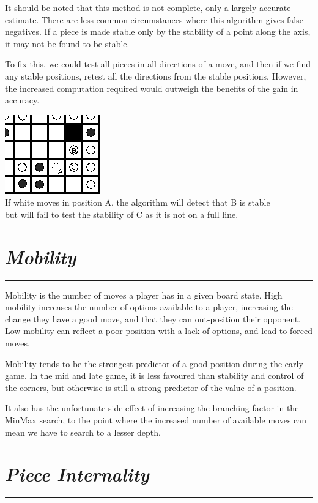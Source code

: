 \documentclass[10pt]{report}
\begin{document}
\begin{multicols}{2}
It should be noted that this method is not complete, only a largely accurate estimate. There are less common circumstances where this algorithm gives false negatives. If a piece is made stable only by the stability of a point along the axis, it may not be found to be stable.

To fix this, we could test all pieces in all directions of a move, and then if we find any stable positions, retest all the directions from the stable positions. However, the increased computation required would outweigh the benefits of the gain in accuracy.

\begin{center}
\includegraphics[scale=0.6]{falsepos.PNG}\\
If white moves in position A, the algorithm will detect that B is stable\\ but will fail to test the stability of C as it is not on a full line.
\end{center}

\section*{\emph{\textmd{Mobility}}}
\hrule

Mobility is the number of moves a player has in a given board state. High mobility increases the number of options available to a player, increasing the change they have a good move, and that they can out-position their opponent. Low mobility can reflect a poor position with a lack of options, and lead to forced moves.

Mobility tends to be the strongest predictor of a good position during the early game. In the mid and late game, it is less favoured than stability and control of the corners, but otherwise is still a strong predictor of the value of a position.

It also has the unfortunate side effect of increasing the branching factor in the MinMax search, to the point where the increased number of available moves can mean we have to search to a lesser depth.
\section*{\emph{\textmd{Piece Internality}}}
\hrule


\end{multicols}
\end{document}
